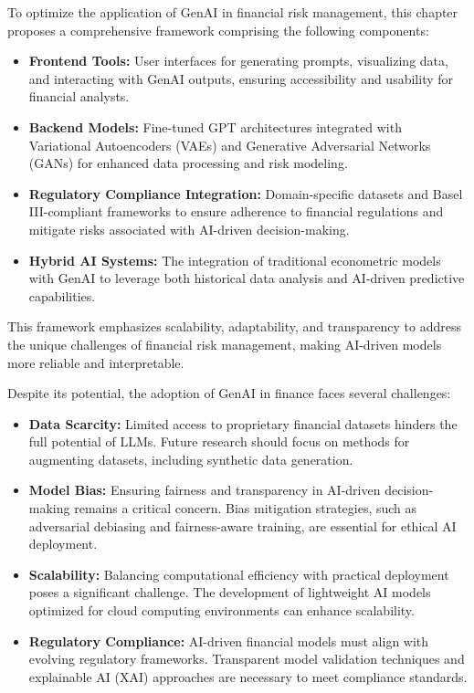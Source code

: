 \documentclass[a4paper,headinclude=on,footinclude=on,12pt,oneside]{scrbook}
\begin{document}
	
	To optimize the application of GenAI in financial risk management, this chapter proposes a comprehensive framework comprising the following components:
	
	\begin{itemize}
		\item \textbf{Frontend Tools:} User interfaces for generating prompts, visualizing data, and interacting with GenAI outputs, ensuring accessibility and usability for financial analysts.
		\item \textbf{Backend Models:} Fine-tuned GPT architectures integrated with Variational Autoencoders (VAEs) and Generative Adversarial Networks (GANs) for enhanced data processing and risk modeling.
		\item \textbf{Regulatory Compliance Integration:} Domain-specific datasets and Basel III-compliant frameworks to ensure adherence to financial regulations and mitigate risks associated with AI-driven decision-making.
		\item \textbf{Hybrid AI Systems:} The integration of traditional econometric models with GenAI to leverage both historical data analysis and AI-driven predictive capabilities.
	\end{itemize}
	
	This framework emphasizes scalability, adaptability, and transparency to address the unique challenges of financial risk management, making AI-driven models more reliable and interpretable.
	
	
	Despite its potential, the adoption of GenAI in finance faces several challenges:
	
	\begin{itemize}
		\item \textbf{Data Scarcity:} Limited access to proprietary financial datasets hinders the full potential of LLMs. Future research should focus on methods for augmenting datasets, including synthetic data generation.
		\item \textbf{Model Bias:} Ensuring fairness and transparency in AI-driven decision-making remains a critical concern. Bias mitigation strategies, such as adversarial debiasing and fairness-aware training, are essential for ethical AI deployment.
		\item \textbf{Scalability:} Balancing computational efficiency with practical deployment poses a significant challenge. The development of lightweight AI models optimized for cloud computing environments can enhance scalability.
		\item \textbf{Regulatory Compliance:} AI-driven financial models must align with evolving regulatory frameworks. Transparent model validation techniques and explainable AI (XAI) approaches are necessary to meet compliance standards.
	\end{itemize}
	
\end{document}
